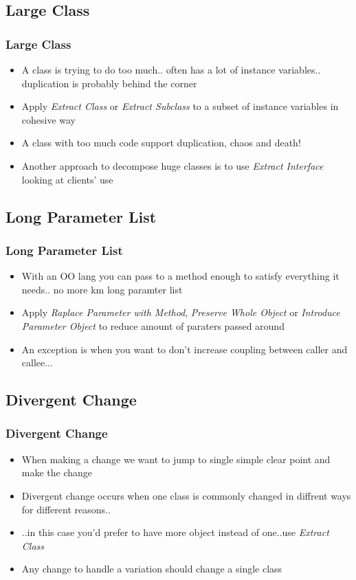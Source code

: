 \documentclass{beamer}
\begin{document}
\subsection{Large Class}
\begin{frame}
  \frametitle{Large Class}
  \begin{itemize}
	\item<+-> A class is trying to do too much.. often has a lot of instance variables.. duplication is probably behind the corner 
	\item<+-> Apply \textit{Extract Class} or \textit{Extract Subclass} to a subset of instance variables in cohesive way
	\item<+-> A class with too much code support duplication, chaos and death!
	\item<+-> Another approach to decompose huge classes is to use \textit{Extract Interface} looking at clients' use
  \end{itemize}
\end{frame}
  
\subsection{Long Parameter List}
\begin{frame}
  \frametitle{Long Parameter List}
  \begin{itemize}
	\item<+-> With an OO lang you can pass to a method enough to satisfy everything it needs.. no more km long paramter list 
	\item<+-> Apply \textit{Raplace Parameter with Method}, \textit{Preserve Whole Object} or \textit{Introduce Parameter Object} to reduce amount of paraters passed around
	\item<+-> An exception is when you want to don't increase coupling between caller and callee...
  \end{itemize}
\end{frame}

\subsection{Divergent Change}
\begin{frame}
  \frametitle{Divergent Change}
  \begin{itemize}
	\item<+-> When making a change we want to jump to single simple clear point and make the change
	\item<+-> Divergent change occurs when one class is commonly changed in diffrent ways for different reasons..
	\item<+-> ..in this case you'd prefer to have more object instead of one..use \textit{Extract Class}
	\item<+-> Any change to handle a variation should change a single class
  \end{itemize}
\end{frame}
\end{document}
